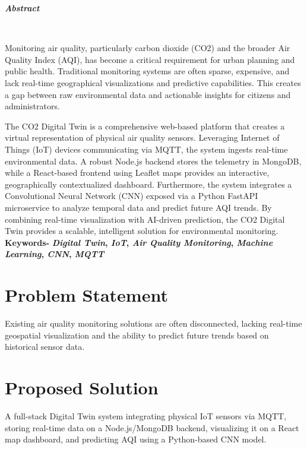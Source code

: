 \documentclass[a4paper, 12pt]{report}
\begin{document}
\thispagestyle{empty}
\begin{center}
	\begin{LARGE}
		\textbf{\textit {Abstract}}\end{LARGE}\\[1.2cm]
\end{center}
Monitoring air quality, particularly carbon dioxide (CO2) and the broader Air Quality Index (AQI), has become a critical requirement for urban planning and public health. Traditional monitoring systems are often sparse, expensive, and lack real-time geographical visualizations and predictive capabilities. This creates a gap between raw environmental data and actionable insights for citizens and administrators.

The CO2 Digital Twin is a comprehensive web-based platform that creates a virtual representation of physical air quality sensors. Leveraging Internet of Things (IoT) devices communicating via MQTT, the system ingests real-time environmental data. A robust Node.js backend stores the telemetry in MongoDB, while a React-based frontend using Leaflet maps provides an interactive, geographically contextualized dashboard. Furthermore, the system integrates a Convolutional Neural Network (CNN) exposed via a Python FastAPI microservice to analyze temporal data and predict future AQI trends. By combining real-time visualization with AI-driven prediction, the CO2 Digital Twin provides a scalable, intelligent solution for environmental monitoring.
\vspace{0.3cm}\\
\textbf{Keywords- } \textbf{\textit{Digital Twin}, \textit{IoT}, \textit{Air Quality Monitoring}, \textit{Machine Learning}, \textit{CNN}, \textit{MQTT}}

\section*{Problem Statement}
Existing air quality monitoring solutions are often disconnected, lacking real-time geospatial visualization and the ability to predict future trends based on historical sensor data.
\section*{Proposed Solution}
A full-stack Digital Twin system integrating physical IoT sensors via MQTT, storing real-time data on a Node.js/MongoDB backend, visualizing it on a React map dashboard, and predicting AQI using a Python-based CNN model.
\end{document}
